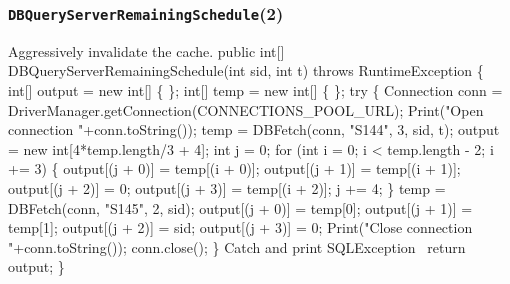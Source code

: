 \documentclass{article}
\def\nwendcode{\endtrivlist \endgroup}      %
\let\nwdocspar=\par
\theoremstyle{definition}                   %
\begin{document}
\subsubsection{{\tt{}\protect{}DBQueryServerRemainingSchedule}(2)}
Aggressively invalidate the cache.
\nwenddocs{}\endmoddef{}
public int[] DBQueryServerRemainingSchedule(int sid, int t)
throws RuntimeException \{
  int[] output = new int[] \{ \};
  int[] temp = new int[] \{ \};
  try \{
    Connection conn = DriverManager.getConnection(CONNECTIONS_POOL_URL);
    Print("Open connection "+conn.toString());
    temp = DBFetch(conn, "S144", 3, sid, t);
    output = new int[4*temp.length/3 + 4];
    int j = 0;
    for (int i = 0; i < temp.length - 2; i += 3) \{
      output[(j + 0)] = temp[(i + 0)];
      output[(j + 1)] = temp[(i + 1)];
      output[(j + 2)] = 0;
      output[(j + 3)] = temp[(i + 2)];
      j += 4;
    \}
    temp = DBFetch(conn, "S145", 2, sid);
    output[(j + 0)] = temp[0];
    output[(j + 1)] = temp[1];
    output[(j + 2)] = sid;
    output[(j + 3)] = 0;
    Print("Close connection "+conn.toString());
    conn.close();
  \}
  \LA{}Catch and print \code{}SQLException\edoc{}~{\nwtagstyle{}}\RA{}
  return output;
\}
\eatline
{}\nwendcode{}\nwdocspar
\end{document}
